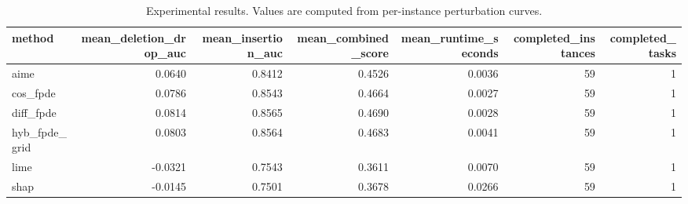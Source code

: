 \begin{table}[t]
\caption{Experimental results. Values are computed from per-instance perturbation curves.}
\label{tab:main_results_computed}
\centering
\begin{tabular}{lrrrrrr}
\toprule
method & mean\_deletion\_drop\_auc & mean\_insertion\_auc & mean\_combined\_score & mean\_runtime\_seconds & completed\_instances & completed\_tasks \\
\midrule
aime & 0.0640 & 0.8412 & 0.4526 & 0.0036 & 59 & 1 \\
cos\_fpde & 0.0786 & 0.8543 & 0.4664 & 0.0027 & 59 & 1 \\
diff\_fpde & 0.0814 & 0.8565 & 0.4690 & 0.0028 & 59 & 1 \\
hyb\_fpde\_grid & 0.0803 & 0.8564 & 0.4683 & 0.0041 & 59 & 1 \\
lime & -0.0321 & 0.7543 & 0.3611 & 0.0070 & 59 & 1 \\
shap & -0.0145 & 0.7501 & 0.3678 & 0.0266 & 59 & 1 \\
\bottomrule
\end{tabular}

\end{table}
